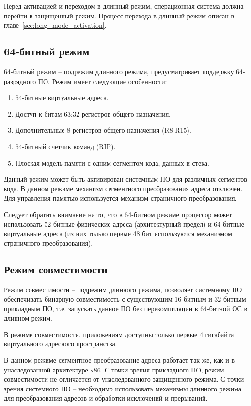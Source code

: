 Перед активацией и переходом в длинный режим, операционная система должна перейти в
защищенный режим. Процесс перехода в длинный режим описан в главе~\ref{sec:long_mode_activation}.

\subsection{64-битный режим}
64-битный режим -- подрежим длинного режима, предусматривает поддержку 64-разрядного
ПО. Режим имеет следующие особенности:
\begin{enumerate}[1.]
\item 64-битные виртуальные адреса.
\item Доступ к битам 63:32 регистров общего назначения.
\item Дополнительные 8 регистров общего назначения (R8-R15).
\item 64-битный счетчик команд (RIP).
\item Плоская модель памяти с одним сегментом кода, данных и стека.
\end{enumerate}

Данный режим может быть активирован системным ПО для различных сегментов кода. В данном режиме
механизм сегментного преобразования адреса отключен. Для управления памятью используется
механизм страничного преобразования.

Следует обратить внимание на то, что в 64-битном режиме процессор может использовать
52-битные физические адреса (архитектурный предел) и 64-битные виртуальные адреса (из них
только первые 48 бит используются механизмом страничного преобразования).

\subsection{Режим совместимости}
Режим совместимости -- подрежим длинного режима, позволяет системному ПО обеспечивать
бинарную совместимость с существующим 16-битным и 32-битным прикладным ПО,
т.е. запускать данное ПО без перекомпиляции в 64-битной ОС в длинном режим.

В режиме совместимости, приложениям доступны только первые 4 гигабайта виртуального адресного пространства.

В данном режиме сегментное преобразование адреса работает так же, как и в унаследованной
архитектуре x86. С точки зрения прикладного ПО, режим совместимости не отличается от унаследованного
защищенного режима. С точки зрения системного ПО -- необходимо использовать механизмы длинного режима для
преобразования адресов и обработки исключений и прерываний.

